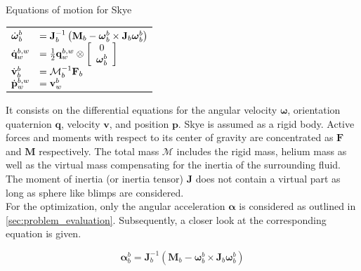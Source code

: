\begin{table}[htb!]
\captionsetup{width=0.9\textwidth}
\centering
\caption{Equations of motion for Skye}
$\begin{array}{ll}
\toprule
\dot{\boldsymbol{\omega}}_b^b &= \mathbf{J}_b^{-1} \left( \mathbf{M}_b  - \boldsymbol{\omega}_b^b \times \mathbf{J}_b \boldsymbol{\omega}_b^b \right) \\

\dot{\mathbf{q}}_w^{b,w} &= \frac{1}{2} \mathbf{q}_w^{b,w} \otimes \left[
\begin{array}{c}
	0 \\ \boldsymbol{\omega}_b^b
\end{array} \right] \\

\dot{\mathbf{v}}_b^b &= \mathbf{\mathcal{M}}_b^{-1} \mathbf{F}_b \\

\dot{\mathbf{p}}_w^{b,w} &= \mathbf{v}_w^b \\

\bottomrule
\end{array}$
\label{tab:sys_mod}
\end{table}

It consists on the differential equations for the angular velocity $\boldsymbol{\omega}$, orientation quaternion $\mathbf{q}$, velocity $\mathbf{v}$, and position $\mathbf{p}$.
Skye is assumed as a rigid body.
Active forces and moments with respect to its center of gravity are concentrated as $\mathbf{F}$ and $\mathbf{M}$ respectively.
The total mass $\mathbf{\mathcal{M}}$ includes the rigid mass, helium mass as well as the virtual mass compensating for the inertia of the surrounding fluid.
The moment of inertia (or inertia tensor) $\mathbf{J}$ does not contain a virtual part as long as sphere like blimps are considered.
\\
For the optimization, only the angular acceleration $\boldsymbol{\alpha}$ is considered as outlined in \cref{sec:problem_evaluation}.
Subsequently, a closer look at the corresponding equation is given.

\begin{equation}
\label{eq:angular_accel}
\boldsymbol{\alpha}_b^b = \mathbf{J}_b^{-1} \left( \mathbf{M}_b  - \boldsymbol{\omega}_b^b \times \mathbf{J}_b \boldsymbol{\omega}_b^b \right)
\end{equation}

